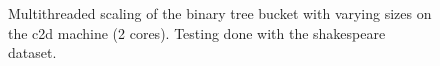 \begin{landscape}
\begin{figure}[H]
{    }
    \label{fig:ts_c2d_shake_btree}
    \caption{Multithreaded scaling of the binary tree bucket with varying sizes on the
    c2d machine (2 cores). Testing done with the shakespeare dataset.}
\end{figure}
\begin{figure}[H]
\end{figure}
\end{landscape}
